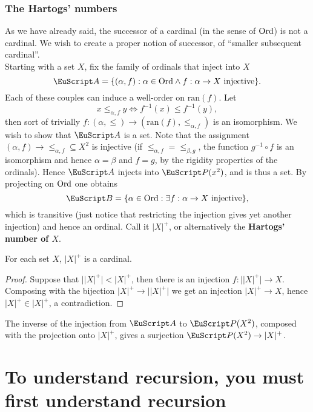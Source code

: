 \documentclass[twoside,openright,titlepage,numbers=noenddot,%
               headinclude,footinclude,cleardoublepage=empty,abstract=on,
               BCOR=23mm,paper=letter,fontsize=11pt
               ]{scrreprt}
\begin{document}
\subsection{The Hartogs' numbers}
As we have already said, the successor of a cardinal (in the sense of $\mathrm{Ord}$) is not a cardinal. We wish to create a proper notion of successor, of ``smaller subsequent cardinal''. \\
Starting with a set $X$, fix the family of ordinals that inject into $X$
\[ \A = \{(\alpha, f): \alpha \in \Ord \land f: \alpha \to X \ \text{injective}\}. \]
Each of these couples can induce a well-order on $\mathrm{ran}(f)$. Let
\[ x \leq_{\alpha, f} y \iff f^{-1}(x) \leq f^{-1}(y), \]
then sort of trivially $f: (\alpha, \leq) \to (\mathrm{ran}(f),\leq_{\alpha,f})$ is an isomorphism. We wish to show that $\A$ is a set. Note that the assignment $(\alpha, f) \to \leq_{\alpha, f} \subseteq X^2$ is injective (if $\leq_{\alpha,f} = \leq_{\beta,g}$, the function $g^{-1}\circ f$ is an isomorphism and hence $\alpha=\beta$ and $f = g$, by the rigidity properties of the ordinals). Hence $\A$ injects into $\P(x^2)$, and is thus a set. By projecting on $\mathrm{Ord}$ one obtains
\[ \B = \{\alpha \in \Ord: \exists f: \alpha \to X \ \text{injective}\}, \]
which is transitive (just notice that restricting the injection gives yet another injection) and hence an ordinal. Call it $\vert X \vert^{+}$, or alternatively the \textbf{Hartogs' number of $X$}.
\begin{proposition}
    For each set $X$, $\vert X \vert^{+}$ is a cardinal.
\end{proposition}
\begin{proof}
    Suppose that $\vert \vert X \vert^{+}\vert < \vert X \vert^{+}$, then there is an injection $f: \vert \vert X \vert^{+}\vert \to X$. Composing with the bijection $\vert X \vert^{+} \to \vert \vert X \vert^{+}\vert$ we get an injection $\vert X \vert^{+} \to X$, hence $\vert X \vert^{+} \in \vert X \vert^{+}$, a contradiction. 
\end{proof}
The inverse of the injection from $\A$ to $\P(X^2)$, composed with the projection onto $\vert X \vert^{+}$, gives a surjection $\P(X^2) \to \vert X \vert^{+}$.
\chapter[Recursion]{To understand recursion, you must first understand recursion}
\end{document}
